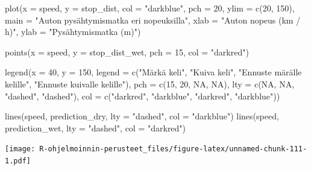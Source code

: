 \documentclass[
]{book}
\newenvironment{Shaded}{\begin{snugshade}}{\end{snugshade}}
\newcommand{\AttributeTok}[1]{\textcolor[rgb]{0.77,0.63,0.00}{#1}}
\newcommand{\ConstantTok}[1]{\textcolor[rgb]{0.00,0.00,0.00}{#1}}
\newcommand{\DecValTok}[1]{\textcolor[rgb]{0.00,0.00,0.81}{#1}}
\newcommand{\FunctionTok}[1]{\textcolor[rgb]{0.00,0.00,0.00}{#1}}
\newcommand{\NormalTok}[1]{#1}
\newcommand{\StringTok}[1]{\textcolor[rgb]{0.31,0.60,0.02}{#1}}
\begin{document}
\begin{Shaded}
\begin{Highlighting}[]
\FunctionTok{plot}\NormalTok{(}\AttributeTok{x =}\NormalTok{ speed, }\AttributeTok{y =}\NormalTok{ stop\_dist,}
     \AttributeTok{col =} \StringTok{"darkblue"}\NormalTok{, }\AttributeTok{pch =} \DecValTok{20}\NormalTok{,}
     \AttributeTok{ylim =} \FunctionTok{c}\NormalTok{(}\DecValTok{20}\NormalTok{, }\DecValTok{150}\NormalTok{),}
     \AttributeTok{main =} \StringTok{"Auton pysähtymismatka eri nopeuksilla"}\NormalTok{,}
     \AttributeTok{xlab =} \StringTok{"Auton nopeus (km / h)"}\NormalTok{, }\AttributeTok{ylab =} \StringTok{"Pysähtymismatka (m)"}\NormalTok{)}

\FunctionTok{points}\NormalTok{(}\AttributeTok{x =}\NormalTok{ speed, }\AttributeTok{y =}\NormalTok{ stop\_dist\_wet, }\AttributeTok{pch =} \DecValTok{15}\NormalTok{, }\AttributeTok{col =} \StringTok{"darkred"}\NormalTok{)}

\FunctionTok{legend}\NormalTok{(}\AttributeTok{x =} \DecValTok{40}\NormalTok{, }\AttributeTok{y =} \DecValTok{150}\NormalTok{,}
       \AttributeTok{legend =} \FunctionTok{c}\NormalTok{(}\StringTok{"Märkä keli"}\NormalTok{, }\StringTok{"Kuiva keli"}\NormalTok{,}
                  \StringTok{"Ennuste märälle kelille"}\NormalTok{,}
                  \StringTok{"Ennuste kuivalle kelille"}\NormalTok{),}
       \AttributeTok{pch =} \FunctionTok{c}\NormalTok{(}\DecValTok{15}\NormalTok{, }\DecValTok{20}\NormalTok{, }\ConstantTok{NA}\NormalTok{, }\ConstantTok{NA}\NormalTok{),}
       \AttributeTok{lty =} \FunctionTok{c}\NormalTok{(}\ConstantTok{NA}\NormalTok{, }\ConstantTok{NA}\NormalTok{, }\StringTok{"dashed"}\NormalTok{, }\StringTok{"dashed"}\NormalTok{),}
       \AttributeTok{col =} \FunctionTok{c}\NormalTok{(}\StringTok{"darkred"}\NormalTok{, }\StringTok{"darkblue"}\NormalTok{, }\StringTok{"darkred"}\NormalTok{, }\StringTok{"darkblue"}\NormalTok{))}

\FunctionTok{lines}\NormalTok{(speed, prediction\_dry, }\AttributeTok{lty =} \StringTok{"dashed"}\NormalTok{, }\AttributeTok{col =} \StringTok{"darkblue"}\NormalTok{)}
\FunctionTok{lines}\NormalTok{(speed, prediction\_wet, }\AttributeTok{lty =} \StringTok{"dashed"}\NormalTok{, }\AttributeTok{col =} \StringTok{"darkred"}\NormalTok{)}
\end{Highlighting}
\end{Shaded}

\texttt{[image: R-ohjelmoinnin-perusteet\_files/figure-latex/unnamed-chunk-111-1.pdf]}
\end{document}
